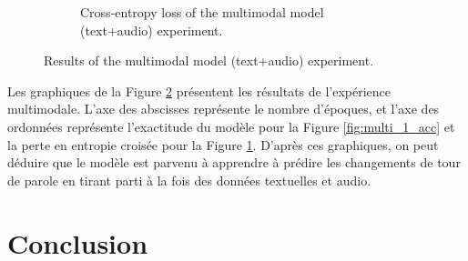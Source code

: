 \documentclass[a4paper]{article}
\begin{document}
\begin{figure}[h]
\begin{subfigure}{0.45\textwidth}
        \caption{Cross-entropy loss of the multimodal model (text+audio) experiment.}
        \label{fig:multi_1_loss}
    \end{subfigure}
    \caption{Results of the multimodal model (text+audio) experiment.}
    \label{fig:multi_1_results}
\end{figure}

Les graphiques de la Figure \ref{fig:multi_1_results} présentent les résultats de l'expérience multimodale. L'axe des abscisses représente le nombre d'époques, et l'axe des ordonnées représente l'exactitude du modèle pour la Figure \ref{fig:multi_1_acc} et la perte en entropie croisée pour la Figure \ref{fig:multi_1_loss}.
D'après ces graphiques, on peut déduire que le modèle est parvenu à apprendre à prédire les changements de tour de parole en tirant parti à la fois des données textuelles et audio.
\section{Conclusion}

\end{document}
